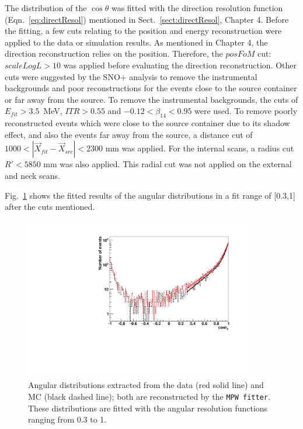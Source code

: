 The distribution of the $\cos\theta$ was fitted with the direction resolution function (Eqn.~\ref{eq:directResol}) mentioned in Sect.~\ref{sect:directResol}, Chapter 4. Before the fitting, a few cuts relating to the position and energy reconstruction were applied to the data or simulation results. As mentioned in Chapter 4, the direction reconstruction relies on the position. Therefore, the $posFoM$ cut: $scaleLogL>10$ was applied before evaluating the direction reconstruction. Other cuts were suggested by the SNO+ analysis to remove the instrumental backgrounds and poor reconstructions for the events close to the source container or far away from the source. To remove the instrumental backgrounds, the cuts of $E_{fit}>3.5$~MeV, $ITR>0.55$ and $-0.12<\beta_{14}<0.95$ were used. To remove poorly reconstructed events which were close to the source container due to its shadow effect, and also the events far away from the source, a distance cut of $1000<|\vec{X}_{fit}-\vec{X}_{src}|<2300$ mm was applied. For the internal scans, a radius cut $R'<5850$ mm was also applied. This radial cut was not applied on the external and neck scans\cite{waterunidoc}.

Fig.~\ref{angularResolMPW} shows the fitted results of the angular distributions in a fit range of [0.3,1] after the cuts mentioned. 
\begin{figure}
	\centering
	\includegraphics[width=10cm]{16NangularResol.pdf}
	\caption[Angular distributions extracted from the data and MC.]{Angular distributions extracted from the data (red solid line) and MC (black dashed line); both are reconstructed by the \texttt{MPW fitter}. These distributions are fitted with the angular resolution functions ranging from 0.3 to 1.}
	\label{angularResolMPW}
\end{figure}

